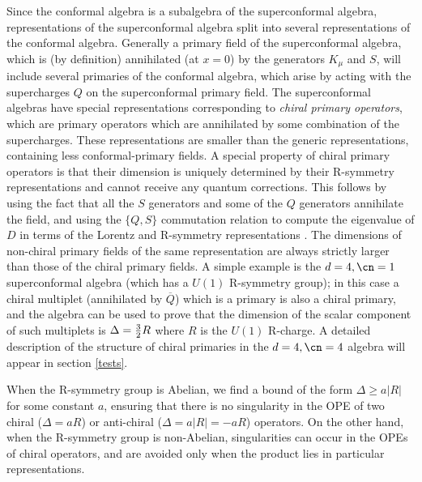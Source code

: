 Since the conformal algebra is a subalgebra of the superconformal
algebra, representations of the superconformal algebra split into
several representations of the conformal algebra. Generally a primary
field of the superconformal algebra, which is (by definition)
annihilated (at $x=0$) by the generators $K_\mu$ and $S$, will include
several primaries of the conformal algebra, which arise by acting with
the supercharges $Q$ on the superconformal primary field. The
superconformal algebras have special representations corresponding to
{\it chiral primary operators}, which are primary operators which are
annihilated by some combination of the supercharges. These
representations are smaller than the generic representations,
containing less conformal-primary fields. A special property of chiral
primary operators is that their dimension is uniquely determined by
their R-symmetry representations and cannot receive any quantum
corrections. This follows by using the fact that all the $S$
generators and some of the $Q$ generators annihilate the field, and
using the $\{Q,S\}$ commutation relation to compute the eigenvalue of
$D$ in terms of the Lorentz and R-symmetry representations
\cite{Kac:1977hp,Dobrev:1987qz,Dobrev:1985qv,Seiberg:1997ax,
Minwalla:1998ka}. The
dimensions of non-chiral primary fields of the same representation are
always strictly larger than those of the chiral primary fields. A
simple example is the $d=4,\cn=1$ superconformal algebra (which has a
$U(1)$ R-symmetry group); in this case a chiral multiplet (annihilated
by $\overline Q$) which is a primary is also a chiral primary, and the
algebra can be used to prove that the dimension of the scalar
component of such multiplets is $\Delta={3\over 2}R$ where $R$ is the
$U(1)$ R-charge. A detailed description of the structure of chiral
primaries in the $d=4,\cn=4$ algebra will appear in section \ref{tests}.

When the R-symmetry group is Abelian, we find a bound of the form
$\Delta \geq a|R|$ for some constant $a$, ensuring that there is no
singularity in the OPE of two chiral ($\Delta=aR$) or anti-chiral
($\Delta=a|R|=-aR$) operators. On the other hand, when the R-symmetry
group is non-Abelian, singularities can occur in the OPEs of chiral
operators, and are avoided only when the product lies in particular
representations.








